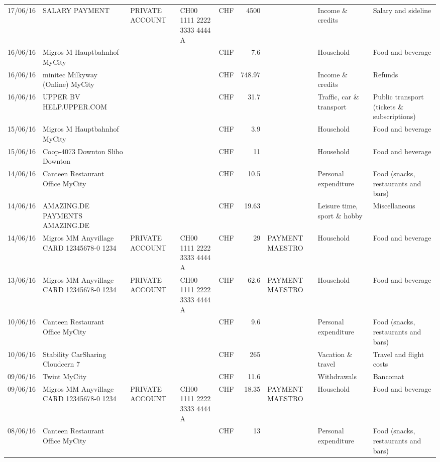 \begin{landscape}
\begin{table}[h]
\begin{center}
\begin{tabular}{rllllrlll}
		17/06/16 & SALARY PAYMENT & PRIVATE ACCOUNT & CH00 1111 2222 3333 4444 A & CHF   & 4500  &       & Income \& credits & Salary and sideline \\
		16/06/16 & Migros M Hauptbahnhof    MyCity &       &       & CHF   & 7.6   &       & Household & Food and beverage \\
		16/06/16 & minitec Milkyway (Online) MyCity &       &       & CHF   & 748.97 &       & Income \& credits & Refunds \\
		16/06/16 & UPPER BV                  HELP.UPPER.COM &       &       & CHF   & 31.7  &       & Traffic, car \& transport & Public transport (tickets \& subscriptions) \\
		15/06/16 & Migros M Hauptbahnhof    MyCity &       &       & CHF   & 3.9   &       & Household & Food and beverage \\
		15/06/16 & Coop-4073 Downton Sliho   Downton &       &       & CHF   & 11    &       & Household & Food and beverage \\
		14/06/16 & Canteen Restaurant Office      MyCity &       &       & CHF   & 10.5  &       & Personal expenditure & Food (snacks, restaurants and bars) \\
		14/06/16 & AMAZING.DE PAYMENTS       AMAZING.DE &       &       & CHF   & 19.63 &       & Leisure time, sport \& hobby & Miscellaneous \\
		14/06/16 & Migros MM Anyvillage CARD 12345678-0 1234 & PRIVATE ACCOUNT & CH00 1111 2222 3333 4444 A & CHF   & 29    & PAYMENT MAESTRO & Household & Food and beverage \\
		13/06/16 & Migros MM Anyvillage CARD 12345678-0 1234 & PRIVATE ACCOUNT & CH00 1111 2222 3333 4444 A & CHF   & 62.6  & PAYMENT MAESTRO & Household & Food and beverage \\
		10/06/16 & Canteen Restaurant Office      MyCity &       &       & CHF   & 9.6   &       & Personal expenditure & Food (snacks, restaurants and bars) \\
		10/06/16 & Stability CarSharing      Cloudcern 7 &       &       & CHF   & 265   &       & Vacation \& travel & Travel and flight costs \\
		09/06/16 & Twint               MyCity &       &       & CHF   & 11.6  &       & Withdrawals & Bancomat \\
		09/06/16 & Migros MM Anyvillage CARD 12345678-0 1234 & PRIVATE ACCOUNT & CH00 1111 2222 3333 4444 A & CHF   & 18.35 & PAYMENT MAESTRO & Household & Food and beverage \\
		08/06/16 & Canteen Restaurant Office      MyCity &       &       & CHF   & 13    &       & Personal expenditure & Food (snacks, restaurants and bars) \\

\end{tabular}
\end{center}
\end{table}
\end{landscape}
